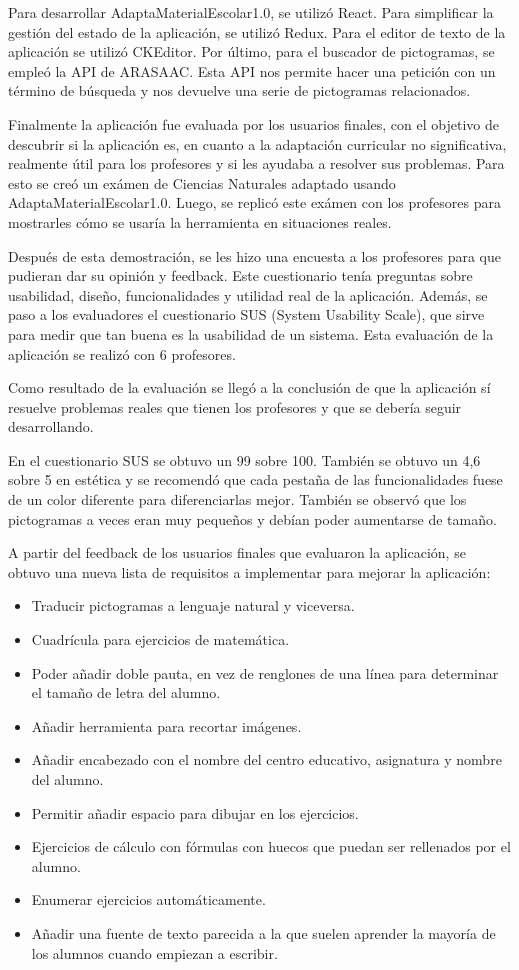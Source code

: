 Para desarrollar AdaptaMaterialEscolar1.0, se utilizó React. Para simplificar la gestión del estado de la aplicación, se utilizó Redux. Para el editor de texto de la aplicación se utilizó CKEditor. Por último, para el buscador de pictogramas, se empleó la API de ARASAAC. Esta API nos permite hacer una petición con un término de búsqueda y nos devuelve una serie de pictogramas relacionados.

Finalmente la aplicación fue evaluada por los usuarios finales, con el objetivo de descubrir si la aplicación es, en cuanto a la adaptación curricular no significativa, realmente útil para los profesores y si les ayudaba a resolver sus problemas. Para esto se creó un exámen de Ciencias Naturales adaptado usando AdaptaMaterialEscolar1.0. Luego, se replicó este exámen con los profesores para mostrarles cómo se usaría la herramienta en situaciones reales.

Después de esta demostración, se les hizo una encuesta a los profesores para que pudieran dar su opinión y feedback. Este cuestionario tenía preguntas sobre usabilidad, diseño, funcionalidades y utilidad real de la aplicación. Además, se paso a los evaluadores el cuestionario SUS (System Usability Scale), que sirve para medir que tan buena es la usabilidad de un sistema. Esta evaluación de la aplicación se realizó con 6 profesores.

Como resultado de la evaluación se llegó a la conclusión de que la aplicación sí resuelve problemas reales que tienen los profesores y que se debería seguir desarrollando.

En el cuestionario SUS se obtuvo un 99 sobre 100. También se obtuvo un 4,6 sobre 5 en estética y se recomendó que cada pestaña de las funcionalidades fuese de un color diferente para diferenciarlas mejor. También se observó que los pictogramas a veces eran muy pequeños y debían poder aumentarse de tamaño.

A partir del feedback de los usuarios finales que evaluaron la aplicación, se obtuvo una nueva lista de requisitos a implementar para mejorar la aplicación:

\begin{itemize}
    \item Traducir pictogramas a lenguaje natural y viceversa.
    \item Cuadrícula para ejercicios de matemática.
    \item Poder añadir doble pauta, en vez de renglones de una línea para determinar el tamaño de letra del alumno.
    \item Añadir herramienta para recortar imágenes.
    \item Añadir encabezado con el nombre del centro educativo, asignatura y nombre del alumno.
    \item Permitir añadir espacio para dibujar en los ejercicios.
    \item Ejercicios de cálculo con fórmulas con huecos que puedan ser rellenados por el alumno.
    \item Enumerar ejercicios automáticamente.
    \item Añadir una fuente de texto parecida a la que suelen aprender la mayoría de los alumnos cuando empiezan a escribir.
\end{itemize}